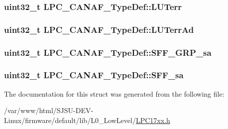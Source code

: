 \subsubsection[{\texorpdfstring{L\+U\+Terr}{LUTerr}}]{ uint32\+\_\+t L\+P\+C\+\_\+\+C\+A\+N\+A\+F\+\_\+\+Type\+Def\+::\+L\+U\+Terr}\hypertarget{structLPC__CANAF__TypeDef_a3906d84d280b16221f3abfc14ec40bd7}{}\label{structLPC__CANAF__TypeDef_a3906d84d280b16221f3abfc14ec40bd7}
\subsubsection[{\texorpdfstring{L\+U\+Terr\+Ad}{LUTerrAd}}]{ uint32\+\_\+t L\+P\+C\+\_\+\+C\+A\+N\+A\+F\+\_\+\+Type\+Def\+::\+L\+U\+Terr\+Ad}\hypertarget{structLPC__CANAF__TypeDef_adcb2a37f728f5c881aad68c9f390b82b}{}\label{structLPC__CANAF__TypeDef_adcb2a37f728f5c881aad68c9f390b82b}
\subsubsection[{\texorpdfstring{S\+F\+F\+\_\+\+G\+R\+P\+\_\+sa}{SFF_GRP_sa}}]{ uint32\+\_\+t L\+P\+C\+\_\+\+C\+A\+N\+A\+F\+\_\+\+Type\+Def\+::\+S\+F\+F\+\_\+\+G\+R\+P\+\_\+sa}\hypertarget{structLPC__CANAF__TypeDef_a372d5dfdf917983f56e4b337dba0cbba}{}\label{structLPC__CANAF__TypeDef_a372d5dfdf917983f56e4b337dba0cbba}
\subsubsection[{\texorpdfstring{S\+F\+F\+\_\+sa}{SFF_sa}}]{ uint32\+\_\+t L\+P\+C\+\_\+\+C\+A\+N\+A\+F\+\_\+\+Type\+Def\+::\+S\+F\+F\+\_\+sa}\hypertarget{structLPC__CANAF__TypeDef_a55cb93958630b8b11dc10c682d7ede3a}{}\label{structLPC__CANAF__TypeDef_a55cb93958630b8b11dc10c682d7ede3a}


The documentation for this struct was generated from the following file\+:\begin{DoxyCompactItemize}
\item 
/var/www/html/\+S\+J\+S\+U-\/\+D\+E\+V-\/\+Linux/firmware/default/lib/\+L0\+\_\+\+Low\+Level/\hyperlink{LPC17xx_8h}{L\+P\+C17xx.\+h}\end{DoxyCompactItemize}
